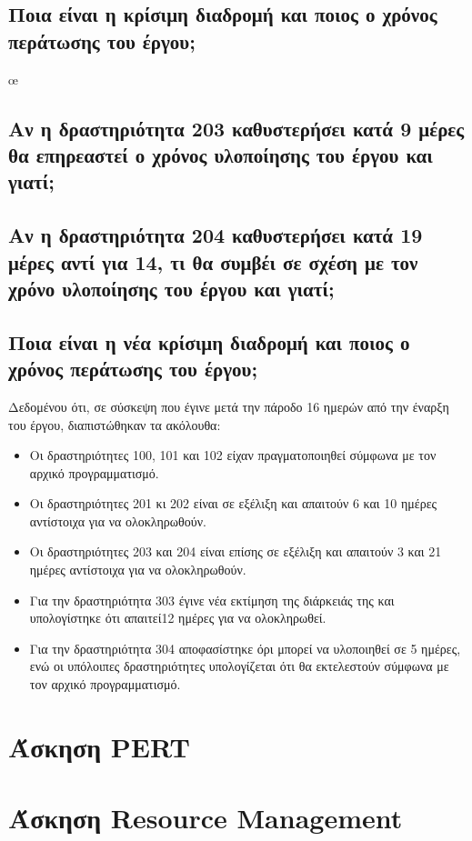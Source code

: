 \documentclass[12pt]{turabian-researchpaper}
\begin{document}
\subsection{Ποια είναι η κρίσιμη διαδρομή και ποιος ο χρόνος περάτωσης του έργου;}
œ
\subsection{Αν η δραστηριότητα 203 καθυστερήσει κατά 9 μέρες θα επηρεαστεί ο χρόνος υλοποίησης του έργου και γιατί;}

\subsection{Αν η δραστηριότητα 204 καθυστερήσει κατά 19 μέρες αντί για 14, τι θα συμβέι σε σχέση με τον χρόνο υλοποίησης του έργου και γιατί;}

\subsection{Ποια είναι η νέα κρίσιμη διαδρομή και ποιος ο χρόνος περάτωσης του έργου;}
Δεδομένου ότι, σε σύσκεψη που έγινε μετά την πάροδο 16 ημερών από την έναρξη του έργου, διαπιστώθηκαν τα ακόλουθα:
\begin{itemize}
    \item Οι δραστηριότητες 100, 101 και 102 είχαν πραγματοποιηθεί σύμφωνα με τον αρχικό προγραμματισμό.
    \item Οι δραστηριότητες 201 κι 202 είναι σε εξέλιξη και απαιτούν 6 και 10 ημέρες αντίστοιχα για να ολοκληρωθούν.
    \item Οι δραστηριότητες 203 και 204 είναι επίσης σε εξέλιξη και απαιτούν 3 και 21 ημέρες αντίστοιχα για να ολοκληρωθούν.
    \item Για την δραστηριότητα 303 έγινε νέα εκτίμηση της διάρκειάς της και υπολογίστηκε ότι απαιτεί12 ημέρες για να ολοκληρωθεί.
    \item Για την δραστηριότητα 304 αποφασίστηκε όρι μπορεί να υλοποιηθεί σε 5 ημέρες, ενώ οι υπόλοιπες δραστηριότητες υπολογίζεται ότι θα εκτελεστούν σύμφωνα με τον αρχικό προγραμματισμό.
\end{itemize}


\section{Άσκηση PERT}

\section{Άσκηση Resource Management}
\end{document}
